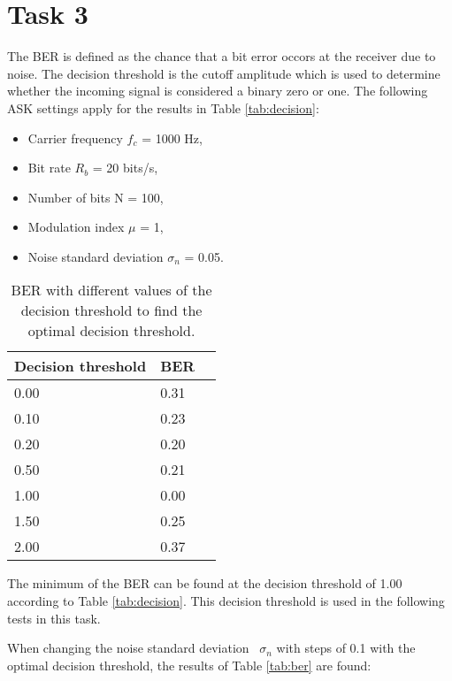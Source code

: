 \documentclass[final]{scrreprt} %
\begin{document}
\section{Task 3}
\label{ch:task3}
The BER is defined as the chance that a bit error occors at the receiver due to noise. The decision threshold is the cutoff amplitude which is used to determine whether the incoming signal is considered a binary zero or one. The following ASK settings apply for the results in Table \ref{tab:decision}:

\begin{itemize}
    \item Carrier frequency $f_c$ = 1000 Hz,
    \item Bit rate $R_b$ = 20 bits/s,
    \item Number of bits N = 100,
    \item Modulation index $\mu$ = 1,
    \item Noise standard deviation $\sigma_n$ = 0.05.
\end{itemize}

\begin{table}[h]
\begin{center}
\begin{tabular}{ | l | l | l | }
    \hline
    Decision threshold & BER \\\hline
    0.00 & 0.31 \\\hline
    0.10 & 0.23 \\\hline
    0.20 & 0.20 \\\hline
    0.50 & 0.21 \\\hline
    1.00 & 0.00 \\\hline
    1.50 & 0.25 \\\hline
    2.00 & 0.37 \\\hline
\end{tabular}
\caption{BER with different values of the decision threshold to find the optimal decision threshold.}
\end{center}
\end{table}
\label{tab:decision}

The minimum of the BER can be found at the decision threshold of 1.00 according to Table \ref{tab:decision}. This decision threshold is used in the following tests in this task.

When changing the noise standard deviation ~$\sigma_n$ with steps of 0.1 with the optimal decision threshold, the results of Table \ref{tab:ber} are found:
\end{document}

